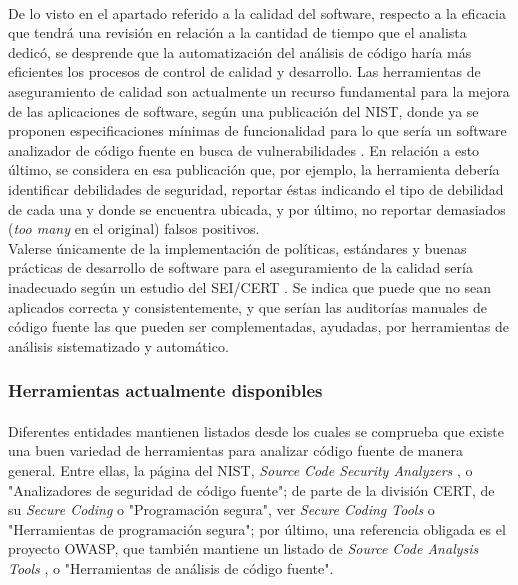 \documentclass[11pt,a4paper]{article}
\begin{document}
\paragraph{}De lo visto en el apartado referido a la calidad del software, respecto a la eficacia que tendrá una revisión en relación a la cantidad de tiempo que el analista dedicó, se desprende que la automatización del análisis de código haría más eficientes los procesos de control de calidad y desarrollo. Las herramientas de aseguramiento de calidad son actualmente un recurso fundamental para la mejora de las aplicaciones de software, según una publicación del NIST, donde ya se proponen especificaciones mínimas de funcionalidad para lo que sería un software analizador de código fuente en busca de vulnerabilidades \cite{nist1}. En relación a esto último, se considera en esa publicación que, por ejemplo, la herramienta debería identificar debilidades de seguridad, reportar éstas indicando el tipo de debilidad de cada una y donde se encuentra ubicada, y por último, no reportar demasiados (\textit{too many} en el original) falsos positivos.
\\

Valerse únicamente de la implementación de políticas, estándares y buenas prácticas de desarrollo de software para el aseguramiento de la calidad sería inadecuado según un estudio del SEI/CERT \cite{sei1}. Se indica que puede que no sean aplicados correcta y consistentemente, y que serían las auditorías manuales de código fuente las que pueden ser complementadas, ayudadas, por herramientas de análisis sistematizado y automático.
\\

\subsubsection{Herramientas actualmente disponibles}

\paragraph{}Diferentes entidades mantienen listados desde los cuales se comprueba que existe una buen variedad de herramientas para analizar código fuente de manera general. Entre ellas, la página del NIST, \textit{Source Code Security Analyzers} \cite{nist2}, o "Analizadores de seguridad de código fuente"; de parte de la división CERT, de su \textit{Secure Coding} o "Programación segura", ver \textit{Secure Coding Tools} \cite{sei2} o "Herramientas de programación segura"; por último, una referencia obligada es el proyecto OWASP, que también mantiene un listado de \textit{Source Code Analysis Tools} \cite{owa1}, o "Herramientas de análisis de código fuente".
\\
\end{document}

